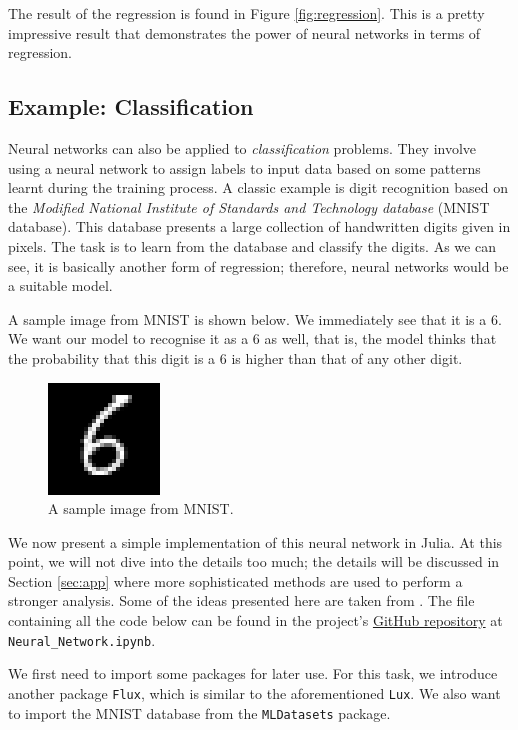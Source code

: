 \documentclass[a4paper,11pt,titlepage]{article}
\theoremstyle{definition}
\theoremstyle{plain}
\theoremstyle{remark}
\begin{document}
The result of the regression is found in Figure \ref{fig:regression}. This is a pretty impressive result that demonstrates the power of neural networks in terms of regression.

\subsection{Example: Classification}
\label{sec:cla}

Neural networks can also be applied to \textit{classification} problems. They involve using a neural network to assign labels to input data based on some patterns learnt during the training process. A classic example is digit recognition based on the \textit{Modified National Institute of Standards and Technology database} (MNIST database). This database presents a large collection of handwritten digits given in pixels. The task is to learn from the database and classify the digits. As we can see, it is basically another form of regression; therefore, neural networks would be a suitable model.

A sample image from MNIST is shown below. We immediately see that it is a $6$. We want our model to recognise it as a $6$ as well, that is, the model thinks that the probability that this digit is a $6$ is higher than that of any other digit.

\begin{figure}[htbp]
    \centering
    \includegraphics{report/figures/6.png}
    \caption{A sample image from MNIST.}
    \label{fig:6}
\end{figure}

We now present a simple implementation of this neural network in Julia. At this point, we will not dive into the details too much; the details will be discussed in Section \ref{sec:app} where more sophisticated methods are used to perform a stronger analysis. Some of the ideas presented here are taken from \cite{Piotr}. The file containing all the code below can be found in the project's \href{https://github.com/jaamestaay/M2R-Group-29}{GitHub repository} at \verb|Neural_Network.ipynb|.

We first need to import some packages for later use. For this task, we introduce another package \verb|Flux|, which is similar to the aforementioned \verb|Lux|. We also want to import the MNIST database from the \verb|MLDatasets| package.
\end{document}
